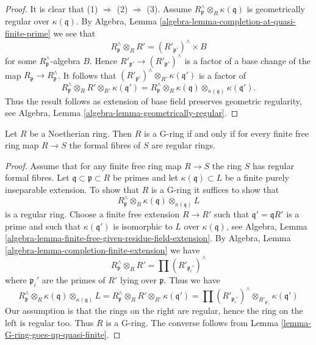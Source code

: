 \begin{proof}
It is clear that (1) $\Rightarrow$ (2) $\Rightarrow$ (3).
Assume $R_\mathfrak p^\wedge \otimes_R \kappa(\mathfrak q)$
is geometrically regular over $\kappa(\mathfrak q)$.
By Algebra, Lemma \ref{algebra-lemma-completion-at-quasi-finite-prime}
we see that
$$
R_\mathfrak p^\wedge \otimes_R R'
=
(R'_{\mathfrak p'})^\wedge \times B
$$
for some $R_\mathfrak p^\wedge$-algebra $B$. Hence
$R'_{\mathfrak p'} \to (R'_{\mathfrak p'})^\wedge$ is a factor of
a base change of the map $R_\mathfrak p \to R_\mathfrak p^\wedge$.
It follows that $(R'_{\mathfrak p'})^\wedge \otimes_{R'} \kappa(\mathfrak q')$
is a factor of
$$
R_\mathfrak p^\wedge \otimes_R R' \otimes_{R'} \kappa(\mathfrak q') =
R_\mathfrak p^\wedge \otimes_R \kappa(\mathfrak q)
\otimes_{\kappa(\mathfrak q)} \kappa(\mathfrak q').
$$
Thus the result follows as extension of base field preserves
geometric regularity, see
Algebra, Lemma \ref{algebra-lemma-geometrically-regular}.
\end{proof}

\begin{lemma}
\label{lemma-check-G-ring}
Let $R$ be a Noetherian ring. Then $R$ is a G-ring if and only if
for every finite free ring map $R \to S$ the formal fibres of $S$
are regular rings.
\end{lemma}

\begin{proof}
Assume that for any finite free ring map $R \to S$ the ring $S$ has
regular formal fibres. Let $\mathfrak q \subset \mathfrak p \subset R$
be primes and let $\kappa(\mathfrak q) \subset L$ be a finite purely
inseparable extension. To show that $R$ is a G-ring it suffices to
show that
$$
R_\mathfrak p^\wedge \otimes_R \kappa(\mathfrak q)
\otimes_{\kappa(\mathfrak q)} L
$$
is a regular ring. Choose a finite free extension $R \to R'$ such that
$\mathfrak q' = \mathfrak qR'$ is a prime and such that $\kappa(\mathfrak q')$
is isomorphic to $L$ over $\kappa(\mathfrak q)$, see
Algebra, Lemma \ref{algebra-lemma-finite-free-given-residue-field-extension}.
By
Algebra, Lemma \ref{algebra-lemma-completion-finite-extension}
we have
$$
R_\mathfrak p^\wedge \otimes_R R' = \prod (R'_{\mathfrak p_i'})^\wedge
$$
where $\mathfrak p_i'$ are the primes of $R'$ lying over $\mathfrak p$.
Thus we have
$$
R_\mathfrak p^\wedge \otimes_R \kappa(\mathfrak q)
\otimes_{\kappa(\mathfrak q)} L =
R_\mathfrak p^\wedge \otimes_R R'
\otimes_{R'} \kappa(\mathfrak q')
=
\prod (R'_{\mathfrak p_i'})^\wedge
\otimes_{R'_{\mathfrak p'_i}} \kappa(\mathfrak q')
$$
Our assumption is that the rings on the right are regular, hence the
ring on the left is regular too. Thus $R$ is a G-ring. The converse
follows from Lemma \ref{lemma-G-ring-goes-up-quasi-finite}.
\end{proof}


